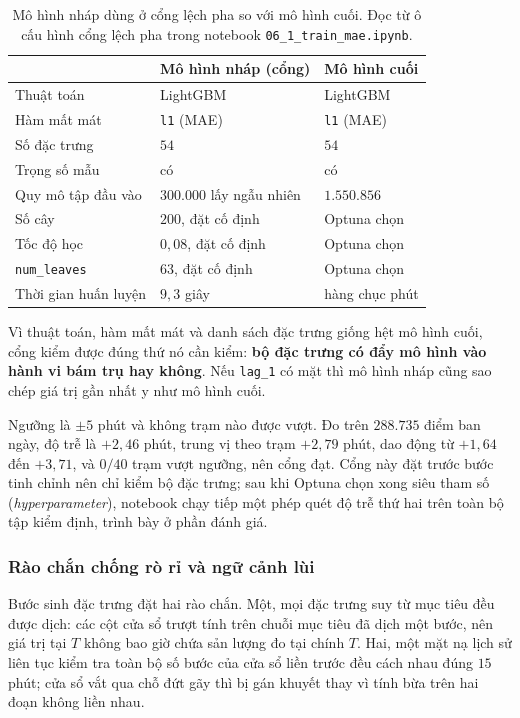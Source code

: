 \documentclass[12pt, a4paper]{report}
\begin{document}
\begin{table}[htbp]
\centering
\caption{Mô hình nháp dùng ở cổng lệch pha so với mô hình cuối. Đọc từ ô cấu hình cổng lệch pha
trong notebook \texttt{06\_1\_train\_mae.ipynb}.}
\label{tab:mo_hinh_nhap}
\small
\begin{tabular}{@{}L{4.6cm} L{4.9cm} L{4.6cm}@{}}
\toprule
 & \textbf{Mô hình nháp (cổng)} & \textbf{Mô hình cuối} \\
\midrule
Thuật toán & LightGBM & LightGBM \\
Hàm mất mát & \texttt{l1} (MAE) & \texttt{l1} (MAE) \\
Số đặc trưng & $54$ & $54$ \\
Trọng số mẫu & có & có \\
\addlinespace
Quy mô tập đầu vào & $300.000$ lấy ngẫu nhiên & $1.550.856$ \\
Số cây & $200$, đặt cố định & Optuna chọn \\
Tốc độ học & $0{,}08$, đặt cố định & Optuna chọn \\
\texttt{num\_leaves} & $63$, đặt cố định & Optuna chọn \\
Thời gian huấn luyện & $9{,}3$ giây & hàng chục phút \\
\bottomrule
\end{tabular}
\end{table}

Vì thuật toán, hàm mất mát và danh sách đặc trưng giống hệt mô hình cuối, cổng kiểm được đúng
thứ nó cần kiểm: \textbf{bộ đặc trưng có đẩy mô hình vào hành vi bám trụ hay không}. Nếu
\texttt{lag\_1} có mặt thì mô hình nháp cũng sao chép giá trị gần nhất y như mô hình cuối.

Ngưỡng là $\pm 5$ phút và không trạm nào được vượt. Đo trên $288.735$ điểm ban ngày, độ
trễ là $+2{,}46$ phút, trung vị theo trạm $+2{,}79$ phút, dao động từ $+1{,}64$ đến
$+3{,}71$, và $0/40$ trạm vượt ngưỡng, nên cổng đạt. Cổng này đặt trước bước tinh chỉnh
nên chỉ kiểm bộ đặc trưng; sau khi Optuna chọn xong siêu tham số (\textit{hyperparameter}), notebook chạy tiếp một
phép quét độ trễ thứ hai trên toàn bộ tập kiểm định, trình bày ở phần đánh giá.

\subsubsection{Rào chắn chống rò rỉ và ngữ cảnh lùi}

Bước sinh đặc trưng đặt hai rào chắn. Một, mọi đặc trưng suy từ mục tiêu đều được dịch:
các cột cửa sổ trượt tính trên chuỗi mục tiêu đã dịch một bước, nên giá trị tại $T$ không
bao giờ chứa sản lượng đo tại chính $T$. Hai, một mặt nạ lịch sử liên tục kiểm tra toàn
bộ số bước của cửa sổ liền trước đều cách nhau đúng $15$ phút; cửa sổ vắt qua chỗ đứt gãy
thì bị gán khuyết thay vì tính bừa trên hai đoạn không liền nhau.
\end{document}
